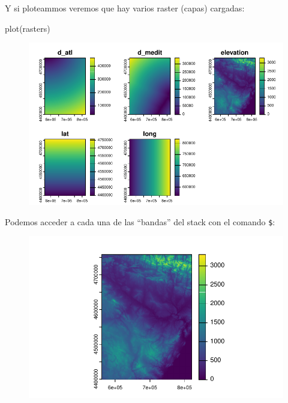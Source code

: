 \documentclass[
  letterpaper,
  DIV=11,
  numbers=noendperiod]{scrreprt}
\newenvironment{Shaded}{\begin{snugshade}}{\end{snugshade}}
\newcommand{\FunctionTok}[1]{\textcolor[rgb]{0.28,0.35,0.67}{#1}}
\newcommand{\NormalTok}[1]{\textcolor[rgb]{0.00,0.23,0.31}{#1}}
\newcommand{\SpecialCharTok}[1]{\textcolor[rgb]{0.37,0.37,0.37}{#1}}
\begin{document}
Y si ploteammos veremos que hay varios raster (capas) cargadas:

\begin{Shaded}
\begin{Highlighting}[]
\FunctionTok{plot}\NormalTok{(rasters)}
\end{Highlighting}
\end{Shaded}

\begin{figure}[H]

{\centering \includegraphics{03_DatosEspaciales_files/figure-pdf/unnamed-chunk-29-1.pdf}

}

\end{figure}

Podemos acceder a cada una de las ``bandas'' del stack con el comando
\texttt{\$}:

\begin{Shaded}
\end{Shaded}

\begin{figure}[H]

{\centering \includegraphics{03_DatosEspaciales_files/figure-pdf/unnamed-chunk-30-1.pdf}

}

\end{figure}
\end{document}

